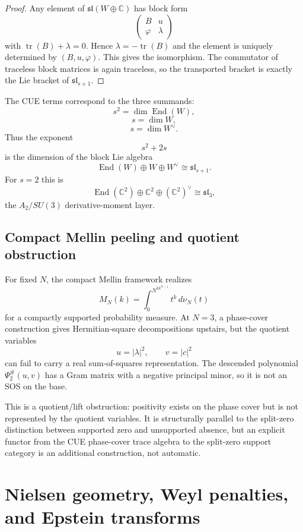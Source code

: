 \documentclass[11pt]{article}
\DeclareMathOperator{\End}{End}
\DeclareMathOperator{\tr}{tr}
\newcommand{\CC}{\mathbb C}
\begin{document}
\begin{proof}
Any element of $\mathfrak{sl}(W\oplus\CC)$ has block form
\[
        \begin{pmatrix}
        B&u\\
        \varphi&\lambda
        \end{pmatrix}
\]
with $\tr(B)+\lambda=0$.  Hence $\lambda=-\tr(B)$ and the element is uniquely determined by $(B,u,\varphi)$.  This gives the isomorphism.  The commutator of traceless block matrices is again traceless, so the transported bracket is exactly the Lie bracket of $\mathfrak{sl}_{s+1}$.
\end{proof}

The CUE terms correspond to the three summands:
\[
        s^2=\dim\End(W),
\]
\[
        s=\dim W,
\]
\[
        s=\dim W^\vee.
\]
Thus the exponent
\[
        s^2+2s
\]
is the dimension of the block Lie algebra
\[
        \End(W)\oplus W\oplus W^\vee\cong\mathfrak{sl}_{s+1}.
\]
For $s=2$ this is
\[
        \End(\CC^2)\oplus\CC^2\oplus(\CC^2)^\vee\cong\mathfrak{sl}_3,
\]
the $A_2/SU(3)$ derivative-moment layer.

\subsection{Compact Mellin peeling and quotient obstruction}

For fixed $N$, the compact Mellin framework realizes
\[
        M_N(k)=\int_0^{N^24^{N-1}}t^k\,d\nu_N(t)
\]
for a compactly supported probability measure.  At $N=3$, a phase-cover construction gives Hermitian-square decompositions upstairs, but the quotient variables
\[
        u=|\lambda|^2,
        \qquad v=|c|^2
\]
can fail to carry a real sum-of-squares representation.  The descended polynomial $\Psi_2^\#(u,v)$ has a Gram matrix with a negative principal minor, so it is not an SOS on the base.

This is a quotient/lift obstruction: positivity exists on the phase cover but is not represented by the quotient variables.  It is structurally parallel to the split-zero distinction between supported zero and unsupported absence, but an explicit functor from the CUE phase-cover trace algebra to the split-zero support category is an additional construction, not automatic.

\section{Nielsen geometry, Weyl penalties, and Epstein transforms}
\end{document}
